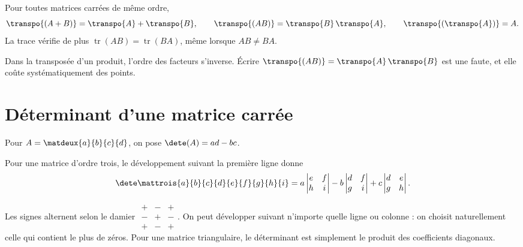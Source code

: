 \begin{propriete}
Pour toutes matrices carrées de même ordre,
\[
  \transpo{(A+B)} = \transpo{A}+\transpo{B}, \qquad
  \transpo{(AB)} = \transpo{B}\,\transpo{A}, \qquad
  \transpo{\left(\transpo{A}\right)} = A .
\]
La trace vérifie de plus $\operatorname{tr}(AB) = \operatorname{tr}(BA)$, même
lorsque $AB \neq BA$.
\end{propriete}

\begin{avertissement}
Dans la transposée d'un produit, l'ordre des facteurs s'inverse. Écrire
$\transpo{(AB)} = \transpo{A}\,\transpo{B}$ est une faute, et elle coûte
systématiquement des points.
\end{avertissement}

\section{Déterminant d'une matrice carrée}

\begin{definition}
Pour $A = \matdeux{a}{b}{c}{d}$, on pose $\dete(A) = ad-bc$.

Pour une matrice d'ordre trois, le développement suivant la première ligne
donne
\[
  \dete
  \mattrois{a}{b}{c}{d}{e}{f}{g}{h}{i}
  = a\begin{vmatrix} e & f \\ h & i \end{vmatrix}
  - b\begin{vmatrix} d & f \\ g & i \end{vmatrix}
  + c\begin{vmatrix} d & e \\ g & h \end{vmatrix}.
\]
\end{definition}

\begin{remarque}
Les signes alternent selon le damier
$\begin{smallmatrix} + & - & + \\ - & + & - \\ + & - & + \end{smallmatrix}$.
On peut développer suivant n'importe quelle ligne ou colonne : on choisit
naturellement celle qui contient le plus de zéros. Pour une matrice
triangulaire, le déterminant est simplement le produit des coefficients
diagonaux.
\end{remarque}

